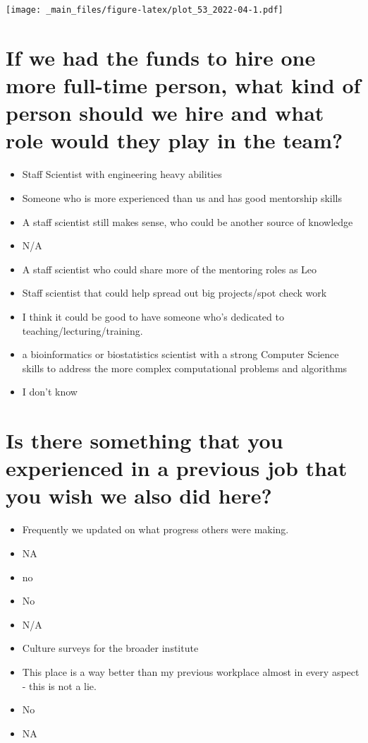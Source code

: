 \documentclass[
]{book}
\providecommand{\tightlist}{%
  \setlength{\itemsep}{0pt}\setlength{\parskip}{0pt}}
\begin{document}
\texttt{[image: \_main\_files/figure-latex/plot\_53\_2022-04-1.pdf]}

\hypertarget{if-we-had-the-funds-to-hire-one-more-full-time-person-what-kind-of-person-should-we-hire-and-what-role-would-they-play-in-the-team}{%
\section{If we had the funds to hire one more full-time person, what kind of person should we hire and what role would they play in the team?}\label{if-we-had-the-funds-to-hire-one-more-full-time-person-what-kind-of-person-should-we-hire-and-what-role-would-they-play-in-the-team}}

\begin{itemize}
\tightlist
\item
  Staff Scientist with engineering heavy abilities
\item
  Someone who is more experienced than us and has good mentorship skills
\item
  A staff scientist still makes sense, who could be another source of knowledge
\item
  N/A
\item
  A staff scientist who could share more of the mentoring roles as Leo
\item
  Staff scientist that could help spread out big projects/spot check work
\item
  I think it could be good to have someone who's dedicated to teaching/lecturing/training.
\item
  a bioinformatics or biostatistics scientist with a strong Computer Science skills to address the more complex computational problems and algorithms
\item
  I don't know
\end{itemize}

\hypertarget{is-there-something-that-you-experienced-in-a-previous-job-that-you-wish-we-also-did-here}{%
\section{Is there something that you experienced in a previous job that you wish we also did here?}\label{is-there-something-that-you-experienced-in-a-previous-job-that-you-wish-we-also-did-here}}

\begin{itemize}
\tightlist
\item
  Frequently we updated on what progress others were making.
\item
  NA
\item
  no
\item
  No
\item
  N/A
\item
  Culture surveys for the broader institute
\item
  This place is a way better than my previous workplace almost in every aspect - this is not a lie.
\item
  No
\item
  NA
\end{itemize}
\end{document}
